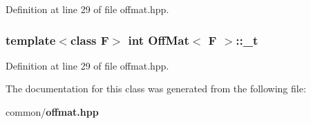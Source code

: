 Definition at line 29 of file offmat.hpp.
\subsubsection{\setlength{\rightskip}{0pt plus 5cm}template$<$class F$>$ int {\bf Off\-Mat}$<$ F $>$::{\bf \_\-t}}\label{classOffMat_05cb7dc333ca611d0a8969704e39a9f0_05cb7dc333ca611d0a8969704e39a9f0}




Definition at line 29 of file offmat.hpp.

The documentation for this class was generated from the following file:\begin{CompactItemize}
\item 
common/{\bf offmat.hpp}\end{CompactItemize}
